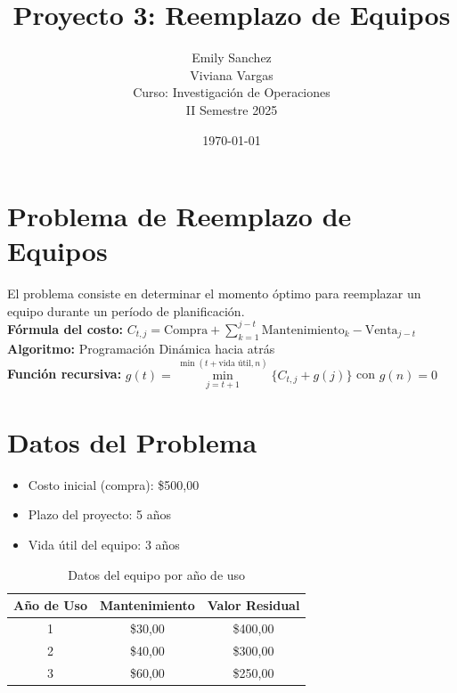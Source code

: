 \documentclass[12pt]{article}
\title{Proyecto 3: Reemplazo de Equipos}
\author{Emily Sanchez \\ Viviana Vargas \\[1cm] Curso: Investigación de Operaciones \\ II Semestre 2025}
\date{\today}
\begin{document}
\maketitle
\newpage
\section*{Problema de Reemplazo de Equipos}
El problema consiste en determinar el momento óptimo para reemplazar un equipo durante un período de planificación.\\
\textbf{Fórmula del costo:} $C_{t,j} = \text{Compra} + \sum_{k=1}^{j-t} \text{Mantenimiento}_k - \text{Venta}_{j-t}$\\
\textbf{Algoritmo:} Programación Dinámica hacia atrás\\
\textbf{Función recursiva:} $g(t) = \min\limits_{j=t+1}^{\min(t+\text{vida útil}, n)} \{C_{t,j} + g(j)\}$ con $g(n) = 0$\\

\section*{Datos del Problema}
\begin{itemize}
\item Costo inicial (compra): \$500,00
\item Plazo del proyecto: 5 años
\item Vida útil del equipo: 3 años
\end{itemize}

\begin{table}[H]
\centering
\caption{Datos del equipo por año de uso}
\begin{tabular}{ccc}
\toprule
Año de Uso & Mantenimiento & Valor Residual \\
\midrule
1 & \$30,00 & \$400,00 \\
2 & \$40,00 & \$300,00 \\
3 & \$60,00 & \$250,00 \\
\bottomrule
\end{tabular}
\end{table}

\clearpage
\end{document}
